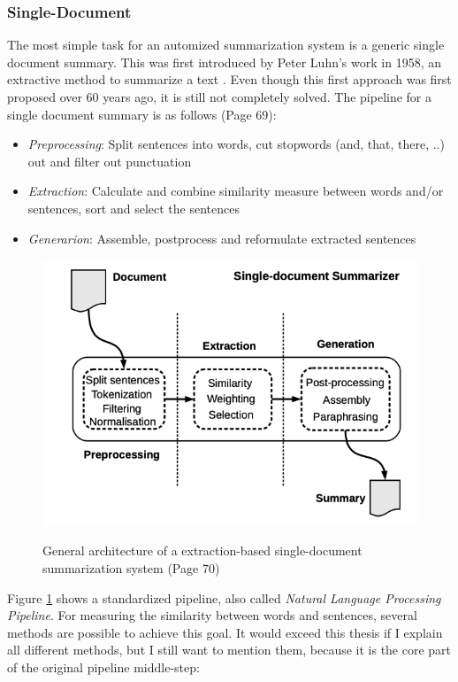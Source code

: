 \subsubsection{Single-Document}\label{ss:sd}
The most simple task for an automized summarization system is a generic single document summary. This was first introduced by Peter Luhn's work in 1958, an extractive method to summarize a text \cite{textmining1958}.  Even though this first approach was first proposed over 60 years ago, it is still not completely solved. The pipeline for a single document summary is as follows \cite{juan} (Page 69):

\begin{itemize}
	\item \textit{Preprocessing}: Split sentences into words, cut stopwords (and, that, there, ..) out and filter out punctuation 
	\item \textit{Extraction}: Calculate and combine similarity measure between words and/or sentences, sort and select the sentences
	\item \textit{Generarion}: Assemble, postprocess and reformulate extracted sentences
\end{itemize}

\begin{figure}
	\begin{center}
		\includegraphics[width=4.5in]{photos/single_doc}\\
		\caption{General architecture of a extraction-based single-document summarization system \cite{juan} (Page 70)}\label{single}
	\end{center}
\end{figure}

Figure \ref{single} shows a standardized pipeline, also called \textit{Natural Language Processing Pipeline}. For measuring the similarity between words and sentences, several methods are possible to achieve this goal. It would exceed this thesis if I explain all different methods, but I still want to mention them, because it is the core part of the original pipeline middle-step:

